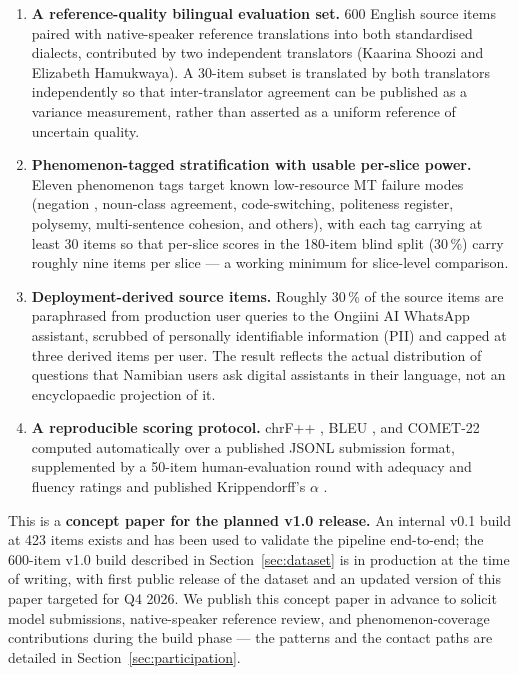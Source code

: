 \documentclass[11pt]{article}
\begin{document}
\begin{enumerate}
\item \textbf{A reference-quality bilingual evaluation set.} 600
  English source items paired with native-speaker reference
  translations into both standardised dialects, contributed by two
  independent translators (Kaarina Shoozi and Elizabeth
  Hamukwaya). A 30-item subset is translated by both translators
  independently so that inter-translator agreement can be published
  as a variance measurement, rather than asserted as a uniform
  reference of uncertain quality.
\item \textbf{Phenomenon-tagged stratification with usable per-slice
  power.} Eleven phenomenon tags target known low-resource MT
  failure modes (negation \citep{hossain2020negation}, noun-class
  agreement, code-switching, politeness register, polysemy,
  multi-sentence cohesion, and others), with each tag carrying at
  least 30 items so that per-slice scores in the 180-item blind
  split (30\,\%) carry roughly nine items per slice --- a working
  minimum for slice-level comparison.
\item \textbf{Deployment-derived source items.} Roughly 30\,\% of the
  source items are paraphrased from production user queries to the
  Ongiini AI WhatsApp assistant, scrubbed of personally identifiable
  information (PII) and capped at three derived items per user.
  The result reflects the actual distribution of questions that
  Namibian users ask digital assistants in their language, not an
  encyclopaedic projection of it.
\item \textbf{A reproducible scoring protocol.} chrF++
  \citep{popovic2017chrf}, BLEU \citep{papineni2002bleu}, and
  COMET-22 \citep{rei2022comet22} computed automatically over a
  published JSONL submission format, supplemented by a 50-item
  human-evaluation round with adequacy and fluency ratings and
  published Krippendorff's $\alpha$ \citep{krippendorff2004content}.
\end{enumerate}

This is a \textbf{concept paper for the planned v1.0 release.} An
internal v0.1 build at 423 items exists and has been used to
validate the pipeline end-to-end; the 600-item v1.0 build described
in Section~\ref{sec:dataset} is in production at the time of
writing, with first public release of the dataset and an updated
version of this paper targeted for Q4 2026. We publish this concept
paper in advance to solicit model submissions, native-speaker
reference review, and phenomenon-coverage contributions during the
build phase --- the patterns and the contact paths are detailed in
Section~\ref{sec:participation}.
\end{document}
